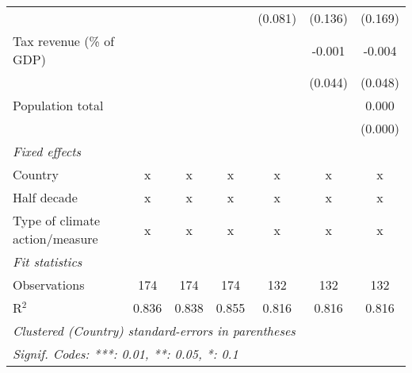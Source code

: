 \begin{tabular}{lcccccc}
                                                               &         &         &                & (0.081)        & (0.136)        & (0.169)\\   
   Tax revenue (\% of GDP)                                     &         &         &                &                & -0.001         & -0.004\\   
                                                               &         &         &                &                & (0.044)        & (0.048)\\   
   Population total                                            &         &         &                &                &                & 0.000\\   
                                                               &         &         &                &                &                & (0.000)\\   
   \emph{Fixed effects}\\
   Country                                                     & x       & x       & x              & x              & x              & x\\  
   Half decade                                                 & x       & x       & x              & x              & x              & x\\  
   Type of climate action/measure                              & x       & x       & x              & x              & x              & x\\  
   \midrule \emph{Fit statistics}\\
   Observations                                                & 174     & 174     & 174            & 132            & 132            & 132\\  
   R$^2$                                                       & 0.836   & 0.838   & 0.855          & 0.816          & 0.816          & 0.816\\  
   \midrule
   \multicolumn{7}{l}{\emph{Clustered (Country) standard-errors in parentheses}}\\
   \multicolumn{7}{l}{\emph{Signif. Codes: ***: 0.01, **: 0.05, *: 0.1}}\\
\end{tabular}
\par\endgroup


